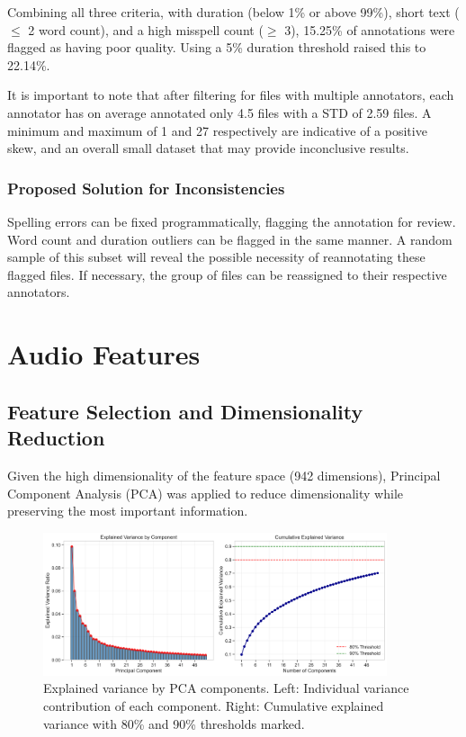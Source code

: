 \documentclass{article}
\begin{document}
Combining all three criteria, with duration (below 1\% or above 99\%), short text ($\leq$ 2 word count), and a high misspell count ($\geq$ 3), 15.25\% of annotations were flagged as having poor quality. Using a 5\% duration threshold raised this to 22.14\%.

It is important to note that after filtering for files with multiple annotators, each annotator has on average annotated only 4.5 files with a STD of 2.59 files. A minimum and maximum of 1 and 27 respectively are indicative of a positive skew, and an overall small dataset that may provide inconclusive results.

\subsubsection{Proposed Solution for Inconsistencies}

Spelling errors can be fixed programmatically, flagging the annotation for review. Word count and duration outliers can be flagged in the same manner. A random sample of this subset will reveal the possible necessity of reannotating these flagged files. If necessary, the group of files can be reassigned to their respective annotators.

\section{Audio Features}
\label{sec:audio_features}

\subsection{Feature Selection and Dimensionality Reduction}

Given the high dimensionality of the feature space (942 dimensions), Principal Component Analysis (PCA) was applied to reduce dimensionality while preserving the most important information.

\begin{figure}[H]
  \centering
  \includegraphics[width=0.9\textwidth]{figures/audio_features/pca_explained_variance.png}
  \caption{Explained variance by PCA components. Left: Individual variance contribution of each component. Right: Cumulative explained variance with 80\% and 90\% thresholds marked.}
  \label{fig:pca_variance}
\end{figure}
\end{document}
